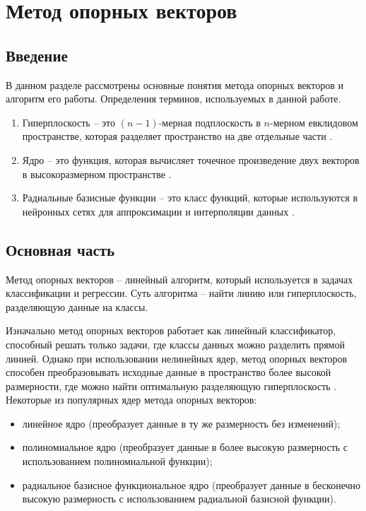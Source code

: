 \chapter{Метод опорных векторов}
\section*{Введение}
В данном разделе рассмотрены основные понятия метода опорных векторов и алгоритм его работы. 
Определения терминов, используемых в данной работе.
\begin{enumerate}
	\item Гиперплоскость – это $(n-1)$-мерная подплоскость в $n$-мерном евклидовом пространстве, которая разделяет пространство на две отдельные части \cite{hyperploskostb}.
	\item Ядро – это функция, которая вычисляет точечное произведение двух векторов в высокоразмерном пространстве \cite{kernel}.
	\item Радиальные базисные функции – это класс функций, которые используются в нейронных сетях для аппроксимации и интерполяции данных \cite{rbf}.
\end{enumerate}

\section*{Основная часть}

Метод опорных векторов – линейный алгоритм, который используется в задачах классификации и регрессии. 
Суть алгоритма – найти линию или гиперплоскость, разделяющую данные на классы.

Изначально метод опорных векторов работает как линейный классификатор, способный решать только задачи, где классы данных можно разделить прямой линией. 
Однако при использовании нелинейных ядер, метод опорных векторов способен преобразовывать исходные данные в пространство более высокой размерности, где можно найти оптимальную разделяющую гиперплоскость \cite{all}. 
Некоторые из популярных ядер метода опорных векторов:
\begin{itemize}
	\item линейное ядро (преобразует данные в ту же размерность без изменений);
	\item полиномиальное ядро (преобразует данные в более высокую размерность с использованием полиномиальной функции);
	\item радиальное базисное функциональное ядро (преобразует данные в бесконечно высокую размерность с использованием радиальной базисной функции).
\end{itemize}

